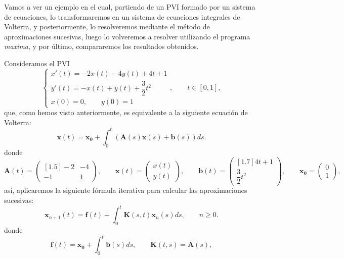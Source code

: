 Vamos a ver un ejemplo en el cual, partiendo de un PVI formado por un sistema de ecuaciones, lo transformaremos en un sistema de ecuaciones integrales de Volterra, y posteriormente, lo resolveremos mediante el método de aproximaciones sucesivas, luego lo volveremos a resolver utilizando el programa \textit{maxima}, y por último, compararemos los resultados obtenidos.
\begin{ejemplo}
	Consideramos el PVI
	\begin{equation}
		\left\lbrace\begin{array}{c} x'(t) = -2x(t)-4y(t) + 4t +1 \\ y'(t) = -x(t) + y(t) +\dfrac{3}{2}t^2 \\ x(0) = 0, \qquad y(0) = 1 \end{array}\right., \qquad t \in [0,1],
	\end{equation}
	que, como hemos visto anteriormente, es equivalente a la siguiente ecuación de Volterra:
	\begin{equation}
		\textbf{x}(t)= \textbf{x}_\textbf{0} + \int_0^t (\textbf{A}(s)\textbf{x}(s)+\textbf{b}(s))ds.
	\end{equation}
	donde
	\begin{equation}
		\textbf{A}(t) = \begin{pmatrix}[1.5]
			-2 & -4 \\ 
			-1 & 1
		\end{pmatrix}, \qquad \textbf{x}(t) = \begin{pmatrix}
			x(t) \\ y(t)
		\end{pmatrix}, \qquad \textbf{b}(t) = \begin{pmatrix}[1.7]
			4t+1 \\ \dfrac{3}{2}t^2
		\end{pmatrix}, \qquad \textbf{x}_\textbf{0} = \begin{pmatrix}
		0 \\ 1
		\end{pmatrix},
	\end{equation}
	así, aplicaremos la siguiente fórmula iterativa para calcular las aproximaciones sucesivas:
	\begin{equation}
		\textbf{x}_{n+1}(t) = \textbf{f}(t) + \int_0^t \textbf{K}(s,t)\textbf{x}_n(s)ds, \qquad n \geqslant 0.
	\end{equation}
	donde
	\begin{equation}
		\textbf{f}(t) = \textbf{x}_\textbf{0} + \int_0^t \textbf{b}(s)ds, \qquad \textbf{K}(t,s) = \textbf{A}(s),
	\end{equation}

\end{ejemplo}
